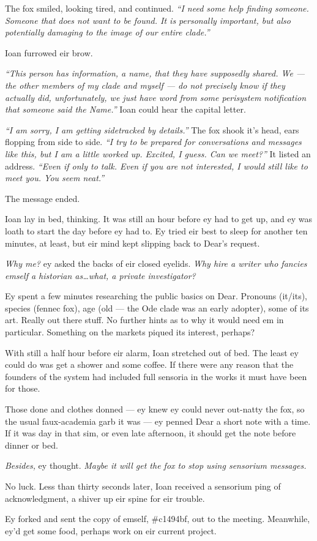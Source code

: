 The fox smiled, looking tired, and continued. \emph{``I need some help finding someone. Someone that does not want to be found. It is personally important, but also potentially damaging to the image of our entire clade.''}

Ioan furrowed eir brow.

\emph{``This person has information, a name, that they have supposedly shared. We — the other members of my clade and myself — do not precisely know if they actually did, unfortunately, we just have word from some perisystem notification that someone said the Name.''} Ioan could hear the capital letter.

\emph{``I am sorry, I am getting sidetracked by details.''} The fox shook it's head, ears flopping from side to side. \emph{``I try to be prepared for conversations and messages like this, but I am a little worked up. Excited, I guess. Can we meet?''} It listed an address. \emph{``Even if only to talk. Even if you are not interested, I would still like to meet you. You seem neat.''}

The message ended.

Ioan lay in bed, thinking. It was still an hour before ey had to get up, and ey was loath to start the day before ey had to. Ey tried eir best to sleep for another ten minutes, at least, but eir mind kept slipping back to Dear's request.

\emph{Why me?} ey asked the backs of eir closed eyelids. \emph{Why hire a writer who fancies emself a historian as\ldots{}what, a private investigator?}

Ey spent a few minutes researching the public basics on Dear. Pronouns (it/its), species (fennec fox), age (old — the Ode clade was an early adopter), some of its art. Really out there stuff. No further hints as to why it would need em in particular. Something on the markets piqued its interest, perhaps?

With still a half hour before eir alarm, Ioan stretched out of bed. The least ey could do was get a shower and some coffee. If there were any reason that the founders of the system had included full sensoria in the works it must have been for those.

Those done and clothes donned — ey knew ey could never out-natty the fox, so the usual faux-academia garb it was — ey penned Dear a short note with a time. If it was day in that sim, or even late afternoon, it should get the note before dinner or bed.

\emph{Besides,} ey thought. \emph{Maybe it will get the fox to stop using sensorium messages.}

No luck. Less than thirty seconds later, Ioan received a sensorium ping of acknowledgment, a shiver up eir spine for eir trouble.

Ey forked and sent the copy of emself, \#c1494bf, out to the meeting. Meanwhile, ey'd get some food, perhaps work on eir current project.
